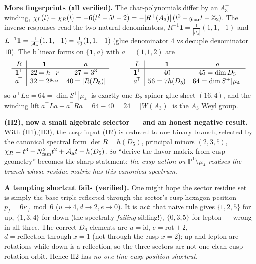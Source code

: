 \smallskip
\noindent\textbf{More fingerprints (all verified).} The char-polynomials differ by an $A_3^+$ winding,
$\chi_L(t)-\chi_R(t)=-6(t^2-5t+2)=-|R^+(A_3)|\,(t^2-g_{\mathrm{car}} t+\mathbb Z_2)$. The inverse responses read the
two natural denominators, $R^{-1}\mathbf 1=\tfrac1{|\mu_4|}(1,1,-1)$ and
$L^{-1}\mathbf 1=\tfrac1{\mathcal A_\Lambda}(1,1,-1)=\tfrac1{10}(1,1,-1)$ (glue denominator $4$ vs decuple denominator
$10$). The bilinear forms on $\{\mathbf 1,a\}$ with $a=(1,1,2)$ are
\begin{equation}
  \begin{array}{c|cc}
  R & \mathbf 1 & a\\\hline
  \mathbf 1^{\!\top} & 22=h{-}r & 27=3^3\\
  a^{\!\top} & 32=2^{g_{\mathrm{car}}} & 40=|R(D_5)|
  \end{array}
  \qquad\quad
  \begin{array}{c|cc}
  L & \mathbf 1 & a\\\hline
  \mathbf 1^{\!\top} & 40 & 45=\dim D_5\\
  a^{\!\top} & 56=7h(D_5) & 64=\dim S^+|\mu_4|
  \end{array}
\end{equation}
so $a^{\!\top}La=64=\dim S^+|\mu_4|$ is exactly one $E_8$ spinor glue sheet $(16,4)$, and the winding lift
$a^{\!\top}La-a^{\!\top}Ra=64-40=24=|W(A_3)|$ is the $A_3$ Weyl group. \mE
\par\smallskip\noindent\textbf{(H2), now a small algebraic selector --- and an honest negative result.}
With (H1),(H3), the cusp input (H2) is reduced to one binary branch, selected by the canonical spectral
form $\det R=h(D_5)$, principal minors $(2,3,5)$, $\chi_R=t^3-N_{\mathrm{fam}}^2t^2+\mathcal A_\Lambda t-h(D_5)$. So ``derive the
flavor matrix from cusp geometry'' becomes the sharp statement: \emph{the cusp action on
$\mathbb P^1\setminus\mu_4$ realises the branch whose residue matrix has this canonical spectrum}.

\smallskip
\noindent\textbf{A tempting shortcut fails (verified).} One might hope the sector residue set is simply
the base triple reflected through the sector's cusp hexagon position $p_f=6\kappa_f\bmod 6$
($u\!\to\!4,d\!\to\!2,e\!\to\!0$). It is \emph{not}: that naive rule gives $\{1,2,5\}$ for up,
$\{1,3,4\}$ for down (the spectrally-\emph{failing} sibling!), $\{0,3,5\}$ for lepton --- wrong in all
three. The correct $D_6$ elements are $u=\mathrm{id}$, $e=\text{rot}+2$, $d=\text{reflection through }x{=}1$
(not through the cusp $x{=}2$); up and lepton are rotations while down is a reflection, so the three
sectors are not one clean cusp-rotation orbit. Hence H2 has \emph{no one-line cusp-position shortcut}.

